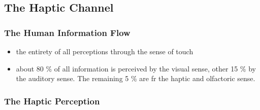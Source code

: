 \documentclass{standalone}
\begin{document}
\subsection{The Haptic Channel}
\subsubsection{The Human Information Flow}
\begin{itemize}
	\item the entirety of all perceptions through the sense of touch
	\item about 80 \% of all information is perceived by the visual sense, other 15 \% by the auditory sense. The remaining 5 \% are fr the haptic and olfactoric sense. 
\end{itemize}
\subsubsection{The Haptic Perception}
\end{document}
